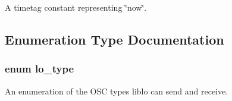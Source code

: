 \-A timetag constant representing \char`\"{}now\char`\"{}. 



\subsection{\-Enumeration \-Type \-Documentation}
\hypertarget{group__liblo_ga11838c576b0197c255ce805fd7434736}{
\subsubsection[{lo\-\_\-type}]{\setlength{\rightskip}{0pt plus 5cm}enum {\bf lo\-\_\-type}}}\label{group__liblo_ga11838c576b0197c255ce805fd7434736}


\-An enumeration of the \-O\-S\-C types liblo can send and receive. 

